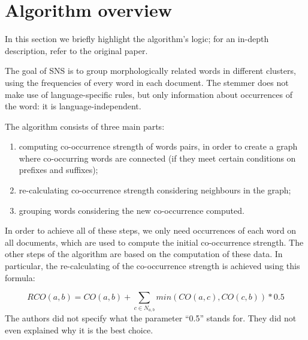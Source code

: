 \section{Algorithm overview}
    In this section we briefly highlight the algorithm's logic; for an in-depth description, refer to the original paper\cite{sns}.
 
    The goal of SNS is to group morphologically related words in different clusters, using the frequencies of every word in each document. The stemmer does not make use of language-specific rules, but only information about occurrences of the word: it is language-independent.
    
The algorithm consists of three main parts:

    \begin{enumerate}
        \item computing co-occurrence strength of words pairs, in order to create a graph where co-occurring words are connected (if they meet certain conditions on prefixes and suffixes);
        \item re-calculating co-occurrence strength considering neighbours in the graph;
        \item grouping words considering the new co-occurrence computed.
    \end{enumerate}

    In order to achieve all of these steps, we only need occurrences of each word on all documents, which are used to compute the initial co-occurrence strength. The other steps of the algorithm are based on the computation of these data. In particular, the re-calculating of the co-occurrence strength is achieved using this formula:
    
    \begin{equation}
		RCO(a,b) = CO(a,b) + \sum_{c \in N_{a,b}}min(CO(a,c), CO(c, b)) * 0.5    
    \end{equation}
    The authors did not specify what the parameter ``0.5'' stands for. They did not even explained why it is the best choice.